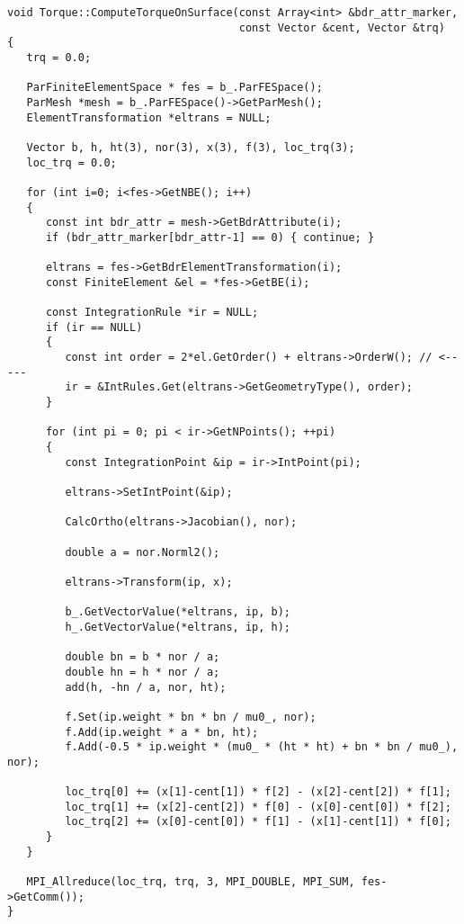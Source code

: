 \documentclass[12pt]{article}
\begin{document}
\begin{verbatim}
void Torque::ComputeTorqueOnSurface(const Array<int> &bdr_attr_marker,
                                    const Vector &cent, Vector &trq)
{
   trq = 0.0;

   ParFiniteElementSpace * fes = b_.ParFESpace();
   ParMesh *mesh = b_.ParFESpace()->GetParMesh();
   ElementTransformation *eltrans = NULL;

   Vector b, h, ht(3), nor(3), x(3), f(3), loc_trq(3);
   loc_trq = 0.0;

   for (int i=0; i<fes->GetNBE(); i++)
   {
      const int bdr_attr = mesh->GetBdrAttribute(i);
      if (bdr_attr_marker[bdr_attr-1] == 0) { continue; }

      eltrans = fes->GetBdrElementTransformation(i);
      const FiniteElement &el = *fes->GetBE(i);

      const IntegrationRule *ir = NULL;
      if (ir == NULL)
      {
         const int order = 2*el.GetOrder() + eltrans->OrderW(); // <-----
         ir = &IntRules.Get(eltrans->GetGeometryType(), order);
      }

      for (int pi = 0; pi < ir->GetNPoints(); ++pi)
      {
         const IntegrationPoint &ip = ir->IntPoint(pi);

         eltrans->SetIntPoint(&ip);

         CalcOrtho(eltrans->Jacobian(), nor);

         double a = nor.Norml2();

         eltrans->Transform(ip, x);

         b_.GetVectorValue(*eltrans, ip, b);
         h_.GetVectorValue(*eltrans, ip, h);

         double bn = b * nor / a;
         double hn = h * nor / a;
         add(h, -hn / a, nor, ht);

         f.Set(ip.weight * bn * bn / mu0_, nor);
         f.Add(ip.weight * a * bn, ht);
         f.Add(-0.5 * ip.weight * (mu0_ * (ht * ht) + bn * bn / mu0_), nor);

         loc_trq[0] += (x[1]-cent[1]) * f[2] - (x[2]-cent[2]) * f[1];
         loc_trq[1] += (x[2]-cent[2]) * f[0] - (x[0]-cent[0]) * f[2];
         loc_trq[2] += (x[0]-cent[0]) * f[1] - (x[1]-cent[1]) * f[0];
      }
   }

   MPI_Allreduce(loc_trq, trq, 3, MPI_DOUBLE, MPI_SUM, fes->GetComm());
}
\end{verbatim}
\end{document}
